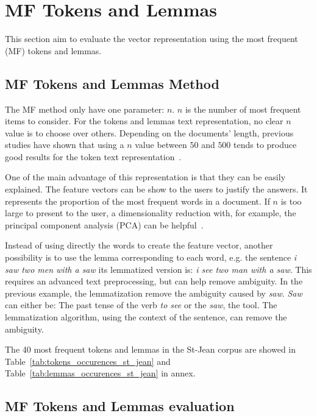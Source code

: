 \section{MF Tokens and Lemmas \label{sec:tokens_lemmas}}

This section aim to evaluate the vector representation using the most frequent (MF) tokens and lemmas.

\subsection{MF Tokens and Lemmas Method}

The MF method only have one parameter: $n$.
$n$ is the number of most frequent items to consider.
For the tokens and lemmas text representation, no clear $n$ value is to choose over others.
Depending on the documents' length, previous studies have shown that using a $n$ value between $50$ and $500$ tends to produce good results for the token text representation~\cite{savoy_text_representation}.

One of the main advantage of this representation is that they can be easily explained.
The feature vectors can be show to the users to justify the answers.
It represents the proportion of the most frequent words in a document.
If $n$ is too large to present to the user, a dimensionality reduction with, for example, the principal component analysis (PCA) can be helpful~\cite{savoy_stylo}.

Instead of using directly the words to create the feature vector, another possibility is to use the lemma corresponding to each word, e.g. the sentence \textit{i saw two men with a saw} its lemmatized version is: \textit{i see two man with a saw}.
This requires an advanced text preprocessing, but can help remove ambiguity.
In the previous example, the lemmatization remove the ambiguity caused by \textit{saw}.
\textit{Saw} can either be: The past tense of the verb \textit{to see} or the \textit{saw}, the tool.
The lemmatization algorithm, using the context of the sentence, can remove the ambiguity.

The 40 most frequent tokens and lemmas in the St-Jean corpus are showed in Table~\ref{tab:tokens_occurences_st_jean} and Table~\ref{tab:lemmas_occurences_st_jean} in annex.

\subsection{MF Tokens and Lemmas evaluation \label{sec:tokens_lemmas_eval}}

